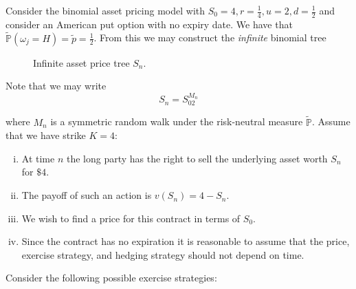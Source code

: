 \documentclass[12pt]{article}
\newlength\tindent
\renewcommand{\indent}{\hspace*{\tindent}}
\renewcommand{\P}{\mathbb P}
\begin{document}
\indent Consider the binomial asset pricing model with $S_0 = 4, r = \frac{1}{4}, u = 2, d = \frac{1}{2}$ and consider an American put option with no expiry date. We have that $\tilde{\P}(\omega_j = H) = \tilde{p} = \frac{1}{2}$. From this we may construct the {\em infinite} binomial tree

\begin{figure}[H]
\centering
{}
\caption{Infinite asset price tree $S_n$.}
\end{figure}

Note that we may write
\begin{equation*}
	S_n = S_02^{M_n}
\end{equation*}

where $M_n$ is a symmetric random walk under the risk-neutral measure $\tilde{\P}$. Assume that we have strike $K = 4$:
\begin{enumerate}[(i)]
	\item At time $n$ the long party has the right to sell the underlying asset worth $S_n$ for $\$4$.
	\item The payoff of such an action is $v(S_n) = 4 - S_n$.
	\item We wish to find a price for this contract in terms of $S_0$.
	\item Since the contract has no expiration it is reasonable to assume that the price, exercise strategy, and hedging strategy should not depend on time.
\end{enumerate}

Consider the following possible exercise strategies: \\
\end{document}
